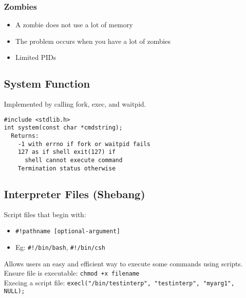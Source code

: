 \documentclass[10pt]{article}
\begin{document}
\begin{multicols}{2}
\begin{minipage}{\columnwidth}
        \subsubsection*{Zombies}
        \begin{itemize}
            \item A zombie does not use a lot of memory
            \item The problem occurs when you have a lot of zombies
            \item Limited PIDs
        \end{itemize}

        \subsection*{System Function}
        Implemented by calling fork, exec, and waitpid.
        \begin{lstlisting}
#include <stdlib.h>
int system(const char *cmdstring);
  Returns:
    -1 with errno if fork or waitpid fails
    127 as if shell exit(127) if
      shell cannot execute command
    Termination status otherwise
    \end{lstlisting}

        \subsection*{Interpreter Files (Shebang)}
        Script files that begin with:
        \begin{itemize}
            \item \texttt{\#!pathname [optional-argument]}
            \item Eg: \texttt{\#!/bin/bash}, \texttt{\#!/bin/csh}
        \end{itemize}
        Allows users an easy and efficient way to execute some commands using
        scripts.
        Ensure file is executable: \texttt{chmod +x filename} \\
        Execing a script file:
        \texttt{execl("/bin/testinterp", "testinterp", "myarg1", NULL);}
    \end{minipage}
    \begin{minipage}{\columnwidth}

\end{minipage}
\end{multicols}
\end{document}
